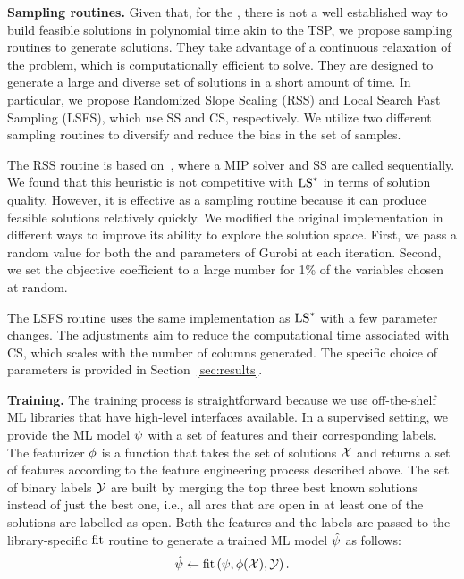 \documentclass[3p, authoryear, times, doubleblind]{elsarticle}
\begin{document}
{\textbf{Sampling routines. } 
Given that, for the \fcn, there is not a well established way to build feasible solutions in polynomial time akin to the TSP, we propose sampling routines to generate solutions. They take advantage of a continuous relaxation of the problem, which is computationally efficient to solve.  They are designed to generate a large and diverse set of solutions in a short amount of time. In particular, we propose Randomized Slope Scaling (RSS) and Local Search Fast Sampling (LSFS), which use SS and CS, respectively. We utilize two different sampling routines to diversify and reduce the bias in the set of samples.

The RSS routine is based on~\cite{gendron_matheuristics_2018},  where a MIP solver and SS are called sequentially. We found that this heuristic is not competitive with $\text{LS}^*$ in terms of solution quality. However, it is effective as a sampling routine because it can produce feasible solutions relatively quickly. We modified the original implementation in  different ways to improve its ability to explore the solution space. First, we pass a random value for both the  and  parameters of Gurobi at each iteration. Second, we set the objective coefficient to a large number for 1\% of the variables chosen at random. %

\startblue 
The LSFS routine uses the same implementation as $\text{LS}^*$ with a few parameter changes. The adjustments aim to reduce the computational time associated with CS, which scales with the number of columns generated. The specific choice of parameters is provided in Section~\ref{sec:results}.  \stopblue 

\textbf{Training. } The training process is straightforward because we use off-the-shelf ML libraries that have high-level interfaces available. In a supervised setting, we provide the ML model $\psi$ with a set of features and their corresponding labels. The featurizer $\phi$ is a function that takes the set of solutions $\mathcal{X}$ and returns a set of features according to the feature engineering process described above. The set of binary labels $\mathcal{Y}$ are built by merging the top three best known solutions instead of just the best one, i.e., all arcs that are open in at least one of the solutions are labelled as open. Both the features and the labels are passed to the library-specific $\text{fit}$ routine to generate a trained ML model $\hat{\psi}$ as follows:
\begin{align} \label{eq:fit}
    \hat{\psi} \gets \text{fit}\left( \psi, \phi(\mathcal{X}), \mathcal{Y} \right). 
\end{align}

}
\end{document}
